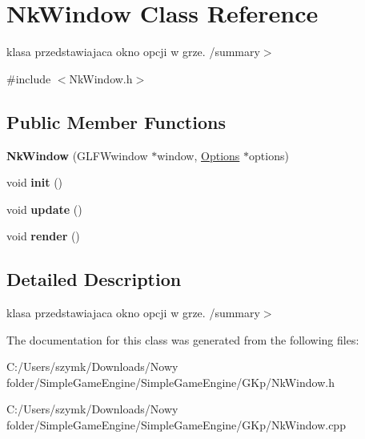 \hypertarget{class_nk_window}{}\section{Nk\+Window Class Reference}
\label{class_nk_window}


klasa przedstawiajaca okno opcji w grze. /summary$>$  




{\ttfamily \#include $<$Nk\+Window.\+h$>$}

\subsection*{Public Member Functions}
\begin{DoxyCompactItemize}
\item 
\mbox{\label{class_nk_window_a419b4756faa51d6d530bbc63b1d945a5}} 
{\bfseries Nk\+Window} (G\+L\+F\+Wwindow $\ast$window, \hyperlink{class_options}{Options} $\ast$options)
\item 
\mbox{\label{class_nk_window_a037e4b09e35ea3a02d98c10c1d1124a1}} 
void {\bfseries init} ()
\item 
\mbox{\label{class_nk_window_a5b2a02d8774f09b63ae76218daa7c343}} 
void {\bfseries update} ()
\item 
\mbox{\label{class_nk_window_a9caf801308c8d962438fd5186129e271}} 
void {\bfseries render} ()
\end{DoxyCompactItemize}


\subsection{Detailed Description}
klasa przedstawiajaca okno opcji w grze. /summary$>$ 

The documentation for this class was generated from the following files\+:\begin{DoxyCompactItemize}
\item 
C\+:/\+Users/szymk/\+Downloads/\+Nowy folder/\+Simple\+Game\+Engine/\+Simple\+Game\+Engine/\+G\+Kp/Nk\+Window.\+h\item 
C\+:/\+Users/szymk/\+Downloads/\+Nowy folder/\+Simple\+Game\+Engine/\+Simple\+Game\+Engine/\+G\+Kp/Nk\+Window.\+cpp\end{DoxyCompactItemize}

